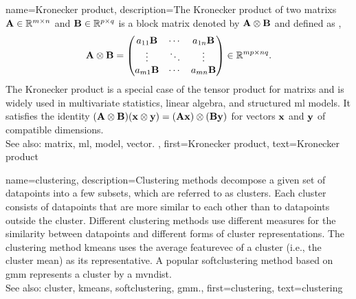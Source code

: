 {name={Kronecker product}, 
	description={The Kronecker product  of two \glspl{matrix} ${\bf A} \in \mathbb{R}^{m \times n}$ 
		and ${\bf B} \in \mathbb{R}^{p \times q}$ is a block \gls{matrix} denoted by ${\bf A} \otimes {\bf B}$ 
	 	and defined as \cite{GolubVanLoanBook}, \cite{HornMatAnalysis}
    		\[
      		{\bf A} \otimes {\bf B} =
      		\begin{pmatrix}
        		a_{11}{\bf B} & \cdots & a_{1n}{\bf B} \\
        		\vdots & \ddots & \vdots \\
        		a_{m1}{\bf B} & \cdots & a_{mn}{\bf B}
      		\end{pmatrix}
      		\in \mathbb{R}^{mp \times nq}.
    		\]
    		The Kronecker product is a special case of the tensor product for \glspl{matrix} and is 
		widely used in multivariate statistics, linear algebra, and structured \gls{ml} \glspl{model}. 
		It satisfies the identity $({\bf A} \otimes {\bf B})({\bf x} \otimes {\bf y}) = ({\bf A}{\bf x}) \otimes ({\bf B}{\bf y})$ 
		for \glspl{vector} ${\bf x}$ and ${\bf y}$ of compatible dimensions.
		\\
		See also: \gls{matrix}, \gls{ml}, \gls{model}, \gls{vector}. },
	first={Kronecker product},
	text={Kronecker product} 
}
	
{name={clustering}, 
	description={Clustering methods decompose a given 
		set of \glspl{datapoint} into a few subsets, which are referred to as \glspl{cluster}. 
		Each \gls{cluster} consists of \glspl{datapoint} that are more similar to each 
		other than to \glspl{datapoint} outside the \gls{cluster}. Different clustering methods 
		use different measures for the similarity between \glspl{datapoint} and different 
		forms of \gls{cluster} representations. The clustering method \gls{kmeans} uses the 
		average \gls{featurevec} of a \gls{cluster} (i.e., the \gls{cluster} \gls{mean}) as its representative. 
		A popular \gls{softclustering} method based on \gls{gmm} represents 
		a \gls{cluster} by a \gls{mvndist}.
				\\
		See also: \gls{cluster}, \gls{kmeans}, \gls{softclustering}, \gls{gmm}.},
	first={clustering},
	text={clustering} 
}
	
